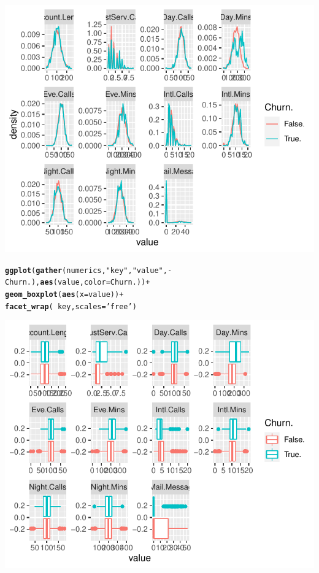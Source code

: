 \documentclass{article}\usepackage[]{graphicx}\usepackage[]{color}
\makeatletter
\def\maxwidth{ %
  \ifdim\Gin@nat@width>\linewidth
    \linewidth
  \else
    \Gin@nat@width
  \fi
}
\newcommand{\hlstr}[1]{\textcolor[rgb]{0.192,0.494,0.8}{#1}}%
\newcommand{\hlopt}[1]{\textcolor[rgb]{0,0,0}{#1}}%
\newcommand{\hlstd}[1]{\textcolor[rgb]{0.345,0.345,0.345}{#1}}%
\newcommand{\hlkwc}[1]{\textcolor[rgb]{0.333,0.667,0.333}{#1}}%
\newcommand{\hlkwd}[1]{\textcolor[rgb]{0.737,0.353,0.396}{\textbf{#1}}}%
\newenvironment{kframe}{%
 \def\at@end@of@kframe{}%
 \ifinner\ifhmode%
  \def\at@end@of@kframe{\end{minipage}}%
  \begin{minipage}{\columnwidth}%
 \fi\fi%
 \def\FrameCommand##1{\hskip\@totalleftmargin \hskip-\fboxsep
 \colorbox{shadecolor}{##1}\hskip-\fboxsep
     \hskip-\linewidth \hskip-\@totalleftmargin \hskip\columnwidth}%
 \MakeFramed {\advance\hsize-\width
   \@totalleftmargin\z@ \linewidth\hsize
   \@setminipage}}%
 {\par\unskip\endMakeFramed%
 \at@end@of@kframe}
\newenvironment{knitrout}{}{} %
\makeatother
\begin{document}
\begin{knitrout}
{\centering \includegraphics[width=\maxwidth]{figure/Overviews_plots_grouped-2} 

}


\begin{kframe}\begin{alltt}
\hlkwd{ggplot}\hlstd{(}\hlkwd{gather}\hlstd{(numerics,} \hlstr{"key"}\hlstd{,} \hlstr{"value"}\hlstd{,} \hlopt{-}\hlstd{Churn.),} \hlkwd{aes}\hlstd{(value,} \hlkwc{color}\hlstd{=Churn.))} \hlopt{+}
  \hlkwd{geom_boxplot}\hlstd{(}\hlkwd{aes}\hlstd{(}\hlkwc{x}\hlstd{=value))} \hlopt{+}
  \hlkwd{facet_wrap}\hlstd{(}\hlopt{~}\hlstd{key,} \hlkwc{scales}\hlstd{=}\hlstr{'free'}\hlstd{)}
\end{alltt}
\end{kframe}

{\centering \includegraphics[width=\maxwidth]{figure/Overviews_plots_grouped-3} 

}
\end{knitrout}
\end{document}

